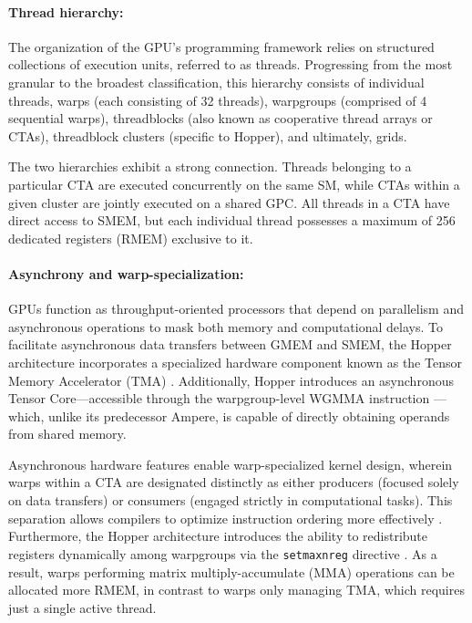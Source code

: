 \begin{enumerate}
\paragraph{Thread hierarchy:} The organization of the GPU's programming framework relies on structured collections of execution units, referred to as threads. Progressing from the most granular to the broadest classification, this hierarchy consists of individual threads, warps (each consisting of 32 threads), warpgroups (comprised of 4 sequential warps), threadblocks (also known as cooperative thread arrays or CTAs), threadblock clusters (specific to Hopper), and ultimately, grids.

The two hierarchies exhibit a strong connection. Threads belonging to a particular CTA are executed concurrently on the same SM, while CTAs within a given cluster are jointly executed on a shared GPC. All threads in a CTA have direct access to SMEM, but each individual thread possesses a maximum of 256 dedicated registers (RMEM) exclusive to it.

\paragraph{Asynchrony and warp-specialization:}

GPUs function as throughput-oriented processors that depend on parallelism and asynchronous operations to mask both memory and computational delays. To facilitate asynchronous data transfers between GMEM and SMEM, the Hopper architecture incorporates a specialized hardware component known as the Tensor Memory Accelerator (TMA) \cite[\S7.29]{cuda}. Additionally, Hopper introduces an asynchronous Tensor Core—accessible through the warpgroup-level WGMMA instruction \cite[\S9.7.14]{ptx}—which, unlike its predecessor Ampere, is capable of directly obtaining operands from shared memory.

Asynchronous hardware features enable warp-specialized kernel design, wherein warps within a CTA are designated distinctly as either producers (focused solely on data transfers) or consumers (engaged strictly in computational tasks). This separation allows compilers to optimize instruction ordering more effectively \citep{warp-specialization-2011}. Furthermore, the Hopper architecture introduces the ability to redistribute registers dynamically among warpgroups via the \verb|setmaxnreg| directive \cite[\S9.7.17.1]{ptx}. As a result, warps performing matrix multiply-accumulate (MMA) operations can be allocated more RMEM, in contrast to warps only managing TMA, which requires just a single active thread.


\end{enumerate}
